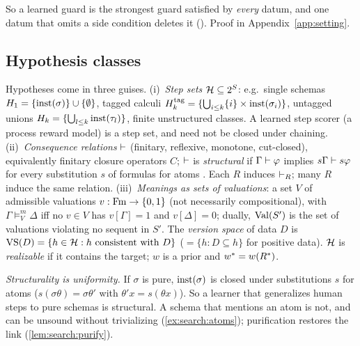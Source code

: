 So a learned guard is the strongest guard satisfied by \emph{every} datum, and one
datum that omits a side condition deletes it (). Proof in
Appendix~\ref{app:setting}.

\subsection{Hypothesis classes}\label{sec:setting:hyp}

\begin{definition}\label{def:setting:hyp}
Hypotheses come in three guises.
(i)~\emph{Step sets} $\mathcal{H}\subseteq2^S$: e.g.\ single schemas
$H_1=\{\mathrm{inst}(\sigma)\}\cup\{\emptyset\}$, tagged calculi
$H^{\mathrm{tag}}_k=\{\bigcup_{i\le k}\{i\}\times\mathrm{inst}(\sigma_i)\}$, untagged
unions $H_k=\{\bigcup_{l\le k}\mathrm{inst}(\tau_l)\}$, finite unstructured classes. A
learned step scorer (a process reward model) is a step set, and need not be
closed under chaining.
(ii)~\emph{Consequence relations} $\vdash$ (finitary, reflexive, monotone,
cut-closed), equivalently finitary closure operators $C$; $\vdash$ is
\emph{structural} if $\Gamma\vdash\varphi$ implies $s\Gamma\vdash s\varphi$ for every
substitution $s$ of formulas for atoms \citep{los1958remarks,wojcicki1988theory}.
Each $R$ induces $\vdash_R$; many $R$ induce the same relation.
(iii)~\emph{Meanings as sets of valuations}: a set $V$ of admissible valuations
$v:\mathrm{Fm}\to\{0,1\}$ (not necessarily compositional), with $\Gamma\models^m_V\Delta$
iff no $v\in V$ has $v[\Gamma]=1$ and $v[\Delta]=0$; dually, $\mathrm{Val}(S')$ is the
set of valuations violating no sequent in $S'$.
The \emph{version space} of data $D$ is $\mathrm{VS}(D)=\{h\in\mathcal{H}: h\text{ consistent
with }D\}$ ($=\{h:D\subseteq h\}$ for positive data). $\mathcal{H}$ is \emph{realizable}
if it contains the target; $w$ is a prior and $w^{*}=w(R^{*})$.
\end{definition}

\emph{Structurality is uniformity.} If $\sigma$ is pure, $\mathrm{inst}(\sigma)$ is closed
under substitutions $s$ for atoms ($s(\sigma\theta)=\sigma\theta'$ with
$\theta'x=s(\theta x)$). So a learner that generalizes human steps to pure schemas
is structural. A schema that mentions an atom is not, and can be unsound without
trivializing (\cref{ex:search:atoms}); purification restores the link
(\cref{lem:search:purify}).

